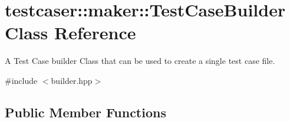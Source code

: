 \hypertarget{classtestcaser_1_1maker_1_1TestCaseBuilder}{}\section{testcaser\+:\+:maker\+:\+:Test\+Case\+Builder Class Reference}
\label{classtestcaser_1_1maker_1_1TestCaseBuilder}


A Test Case builder Class that can be used to create a single test case file.  




{\ttfamily \#include $<$builder.\+hpp$>$}

\subsection*{Public Member Functions}
